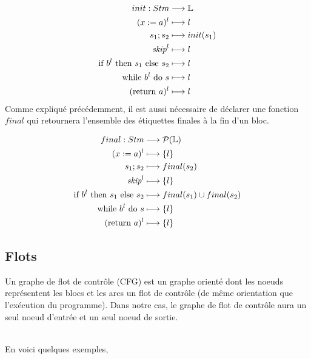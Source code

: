 \documentclass[a4paper, 10pt]{article}
\begin{document}
\begin{align*}
	init : Stm &\longrightarrow \mathbb{L}\\
	({x}\space:=\space{a})^l &\longmapsto l\\
	{s_1}\space;\space{s_2} &\longmapsto init(s_1)\\
	{\textit{skip}}^l &\longmapsto l\\
	\text{if }{b^l}\text{ then }{s_1}\text{ else }{s_2} &\longmapsto l\\
	\text{while }{b^l}\text{ do }{s} &\longmapsto l\\
	(\text{return }{a})^l & \longmapsto l
\end{align*}
Comme expliqué précédemment, il est aussi nécessaire de déclarer une fonction $final$ qui retournera l'ensemble des étiquettes finales 
à la fin d'un bloc.

\begin{align*}
	final : Stm &\longrightarrow \mathcal{P}(\mathbb{L})\\
	({x}\space:=\space{a})^l &\longmapsto \{l\}\\
	{s_1}\space;\space{s_2} &\longmapsto final(s_2)\\
	\textit{skip}^l &\longmapsto \{l\}\\
	\text{if }{b^l}\text{ then }{s_1}\text{ else }{s_2} &\longmapsto final(s_1) \cup final(s_2)\\
	\text{while }{b^l}\text{ do }{s} &\longmapsto \{l\}\\
	(\text{return }{a})^l &\longmapsto \{l\}
\end{align*}

\subsection{Flots}
\begin{definition}
	Un graphe de flot de contrôle (CFG) est un graphe orienté dont les noeuds représentent les blocs et les arcs un
	flot de contrôle (de même orientation que l'exécution du programme). Dans notre cas, le graphe de flot de
	contrôle aura un seul noeud d'entrée et un seul noeud de sortie.
\end{definition}
\\
En voici quelques exemples,
\begin{center}\end{center}
\end{document}
